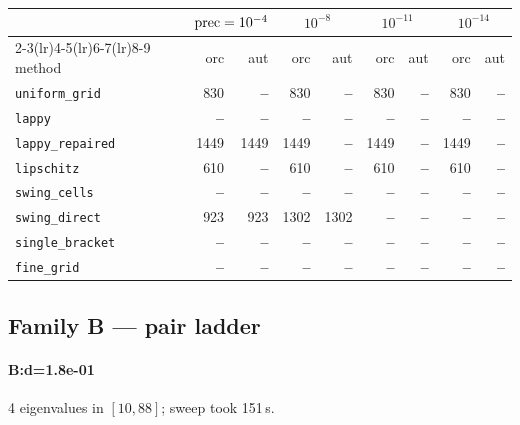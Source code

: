 \begin{center}
\small
\begin{tabular}{lrrrrrrrr}
\toprule
& \multicolumn{2}{c}{$\mathrm{prec}=10^{-4}$} & \multicolumn{2}{c}{$10^{-8}$} & \multicolumn{2}{c}{$10^{-11}$} & \multicolumn{2}{c}{$10^{-14}$} \\
\cmidrule(lr){2-3}\cmidrule(lr){4-5}\cmidrule(lr){6-7}\cmidrule(lr){8-9}
method & orc & aut & orc & aut & orc & aut & orc & aut \\
\midrule
\texttt{uniform\_grid} & 830 & \textbf{--} & 830 & \textbf{--} & 830 & \textbf{--} & 830 & \textbf{--} \\
\texttt{lappy} & \textbf{--} & \textbf{--} & \textbf{--} & \textbf{--} & \textbf{--} & \textbf{--} & \textbf{--} & \textbf{--} \\
\texttt{lappy\_repaired} & 1449 & 1449 & 1449 & \textbf{--} & 1449 & \textbf{--} & 1449 & \textbf{--} \\
\texttt{lipschitz} & 610 & \textbf{--} & 610 & \textbf{--} & 610 & \textbf{--} & 610 & \textbf{--} \\
\texttt{swing\_cells} & \textbf{--} & \textbf{--} & \textbf{--} & \textbf{--} & \textbf{--} & \textbf{--} & \textbf{--} & \textbf{--} \\
\texttt{swing\_direct} & 923 & 923 & 1302 & 1302 & \textbf{--} & \textbf{--} & \textbf{--} & \textbf{--} \\
\midrule
\texttt{single\_bracket} & \textbf{--} & \textbf{--} & \textbf{--} & \textbf{--} & \textbf{--} & \textbf{--} & \textbf{--} & \textbf{--} \\
\texttt{fine\_grid} & \textbf{--} & \textbf{--} & \textbf{--} & \textbf{--} & \textbf{--} & \textbf{--} & \textbf{--} & \textbf{--} \\
\bottomrule
\end{tabular}
\end{center}

\subsection{Family B --- pair ladder}

\paragraph{B:d=1.8e-01} 4 eigenvalues in $[10, 88]$; sweep took 151\,s.

